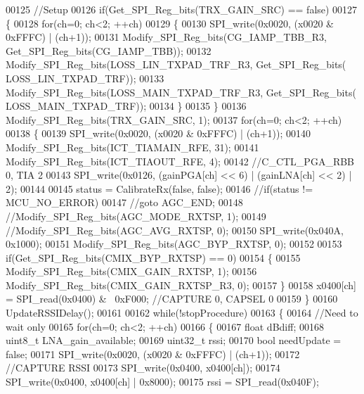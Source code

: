 \begin{DoxyCode}
00125     \textcolor{comment}{//Setup}
00126     \textcolor{keywordflow}{if}(Get_SPI_Reg_bits(TRX_GAIN_SRC) == \textcolor{keyword}{false})
00127     \{
00128         \textcolor{keywordflow}{for}(ch=0; ch<2; ++ch)
00129         \{
00130             SPI_write(0x0020, (x0020 & 0xFFFC) | (ch+1));
00131             Modify_SPI_Reg_bits(CG_IAMP_TBB_R3, Get_SPI_Reg_bits(CG_IAMP_TBB));
00132             Modify_SPI_Reg_bits(LOSS_LIN_TXPAD_TRF_R3, Get_SPI_Reg_bits(
      LOSS_LIN_TXPAD_TRF));
00133             Modify_SPI_Reg_bits(LOSS_MAIN_TXPAD_TRF_R3, Get_SPI_Reg_bits(
      LOSS_MAIN_TXPAD_TRF));
00134         \}
00135     \}
00136     Modify_SPI_Reg_bits(TRX_GAIN_SRC, 1);
00137     \textcolor{keywordflow}{for}(ch=0; ch<2; ++ch)
00138     \{
00139         SPI_write(0x0020, (x0020 & 0xFFFC) | (ch+1));
00140         Modify_SPI_Reg_bits(ICT_TIAMAIN_RFE, 31);
00141         Modify_SPI_Reg_bits(ICT_TIAOUT_RFE, 4);
00142         \textcolor{comment}{//C\_CTL\_PGA\_RBB 0, TIA 2}
00143         SPI_write(0x0126, (gainPGA[ch] << 6) | (gainLNA[ch] << 2) | 2);
00144 
00145         status = CalibrateRx(\textcolor{keyword}{false}, \textcolor{keyword}{false});
00146         \textcolor{comment}{//if(status != MCU\_NO\_ERROR)}
00147             \textcolor{comment}{//goto AGC\_END;}
00148         \textcolor{comment}{//Modify\_SPI\_Reg\_bits(AGC\_MODE\_RXTSP, 1);}
00149         \textcolor{comment}{//Modify\_SPI\_Reg\_bits(AGC\_AVG\_RXTSP, 0);}
00150         SPI_write(0x040A, 0x1000);
00151         Modify_SPI_Reg_bits(AGC_BYP_RXTSP, 0);
00152 
00153         \textcolor{keywordflow}{if}(Get_SPI_Reg_bits(CMIX_BYP_RXTSP) == 0)
00154         \{
00155             Modify_SPI_Reg_bits(CMIX_GAIN_RXTSP, 1);
00156             Modify_SPI_Reg_bits(CMIX_GAIN_RXTSP_R3, 0);
00157         \}
00158         x0400[ch] = SPI_read(0x0400) & ~0xF000; \textcolor{comment}{//CAPTURE 0, CAPSEL 0}
00159     \}
00160     UpdateRSSIDelay();
00161 
00162     \textcolor{keywordflow}{while}(!stopProcedure)
00163     \{
00164         \textcolor{comment}{//Need to wait only}
00165         \textcolor{keywordflow}{for}(ch=0; ch<2; ++ch)
00166         \{
00167             \textcolor{keywordtype}{float} dBdiff;
00168             uint8\_t LNA\_gain\_available;
00169             uint32\_t rssi;
00170             \textcolor{keywordtype}{bool} needUpdate = \textcolor{keyword}{false};
00171             SPI_write(0x0020, (x0020 & 0xFFFC) | (ch+1));
00172             \textcolor{comment}{//CAPTURE RSSI}
00173             SPI_write(0x0400, x0400[ch]);
00174             SPI_write(0x0400, x0400[ch] | 0x8000);
00175             rssi = SPI_read(0x040F);

\end{DoxyCode}

